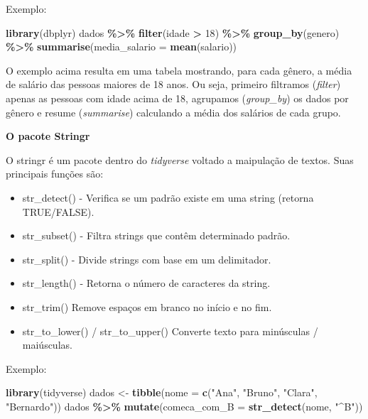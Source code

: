 \documentclass[
]{book}
\newenvironment{Shaded}{\begin{snugshade}}{\end{snugshade}}
\newcommand{\AttributeTok}[1]{\textcolor[rgb]{0.13,0.29,0.53}{#1}}
\newcommand{\DecValTok}[1]{\textcolor[rgb]{0.00,0.00,0.81}{#1}}
\newcommand{\FunctionTok}[1]{\textcolor[rgb]{0.13,0.29,0.53}{\textbf{#1}}}
\newcommand{\NormalTok}[1]{#1}
\newcommand{\OtherTok}[1]{\textcolor[rgb]{0.56,0.35,0.01}{#1}}
\newcommand{\SpecialCharTok}[1]{\textcolor[rgb]{0.81,0.36,0.00}{\textbf{#1}}}
\newcommand{\StringTok}[1]{\textcolor[rgb]{0.31,0.60,0.02}{#1}}
\providecommand{\tightlist}{%
  \setlength{\itemsep}{0pt}\setlength{\parskip}{0pt}}
\begin{document}
Exemplo:

\begin{Shaded}
\begin{Highlighting}[]
\FunctionTok{library}\NormalTok{(dbplyr)}
\NormalTok{dados }\SpecialCharTok{\%\textgreater{}\%} 
  \FunctionTok{filter}\NormalTok{(idade }\SpecialCharTok{\textgreater{}} \DecValTok{18}\NormalTok{) }\SpecialCharTok{\%\textgreater{}\%} 
  \FunctionTok{group\_by}\NormalTok{(genero) }\SpecialCharTok{\%\textgreater{}\%} 
  \FunctionTok{summarise}\NormalTok{(}\AttributeTok{media\_salario =} \FunctionTok{mean}\NormalTok{(salario))}
\end{Highlighting}
\end{Shaded}

O exemplo acima resulta em uma tabela mostrando, para cada gênero, a média de salário das pessoas maiores de 18 anos. Ou seja, primeiro filtramos (\emph{filter}) apenas as pessoas com idade acima de 18, agrupamos (\emph{group\_by}) os dados por gênero e resume (\emph{summarise}) calculando a média dos salários de cada grupo.

\textbf{O pacote Stringr}

O stringr é um pacote dentro do \emph{tidyverse} voltado a maipulação de textos. Suas principais funções são:

\begin{itemize}
\tightlist
\item
  str\_detect() - Verifica se um padrão existe em uma string (retorna TRUE/FALSE).
\item
  str\_subset() - Filtra strings que contêm determinado padrão.
\item
  str\_split() - Divide strings com base em um delimitador.
\item
  str\_length() - Retorna o número de caracteres da string.
\item
  str\_trim() Remove espaços em branco no início e no fim.
\item
  str\_to\_lower() / str\_to\_upper() Converte texto para minúsculas / maiúsculas.
\end{itemize}

Exemplo:

\begin{Shaded}
\begin{Highlighting}[]
\FunctionTok{library}\NormalTok{(tidyverse)}
\NormalTok{dados }\OtherTok{\textless{}{-}} \FunctionTok{tibble}\NormalTok{(}\AttributeTok{nome =} \FunctionTok{c}\NormalTok{(}\StringTok{"Ana"}\NormalTok{, }\StringTok{"Bruno"}\NormalTok{, }\StringTok{"Clara"}\NormalTok{, }\StringTok{"Bernardo"}\NormalTok{))}
\NormalTok{dados }\SpecialCharTok{\%\textgreater{}\%}
  \FunctionTok{mutate}\NormalTok{(}\AttributeTok{comeca\_com\_B =} \FunctionTok{str\_detect}\NormalTok{(nome, }\StringTok{"\^{}B"}\NormalTok{))}
\end{Highlighting}
\end{Shaded}
\end{document}
